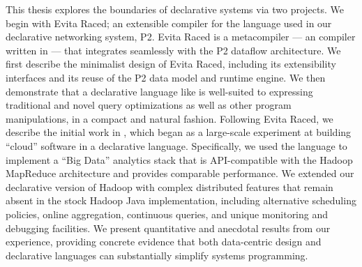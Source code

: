 This thesis explores the boundaries of declarative systems via two projects.
We begin with Evita Raced; an extensible compiler for the \OVERLOG language
used in our declarative networking system, P2.  Evita Raced is a metacompiler
--- an \OVERLOG compiler written in \OVERLOG\@ --- that integrates seamlessly
with the P2 dataflow architecture.  We first describe the minimalist design of
Evita Raced, including its extensibility interfaces and its reuse of the P2
data model and runtime engine.  We then demonstrate that a declarative language
like \OVERLOG is well-suited to expressing traditional and novel query
optimizations as well as other program manipulations, in a compact and natural
fashion.  Following Evita Raced, we describe the initial work in \BOOMA, which
began as a large-scale experiment at building ``cloud'' software in a
declarative language.  Specifically, we used the \OVERLOG language to implement
a ``Big Data'' analytics stack that is API-compatible with the Hadoop MapReduce
architecture and provides comparable performance.  We extended our declarative
version of Hadoop with complex distributed features that remain absent in the
stock Hadoop Java implementation, including alternative scheduling policies,
online aggregation, continuous queries, and unique monitoring and debugging
facilities.  We present quantitative and anecdotal results from our experience,
providing concrete evidence that both data-centric design and declarative
languages can substantially simplify systems programming.



